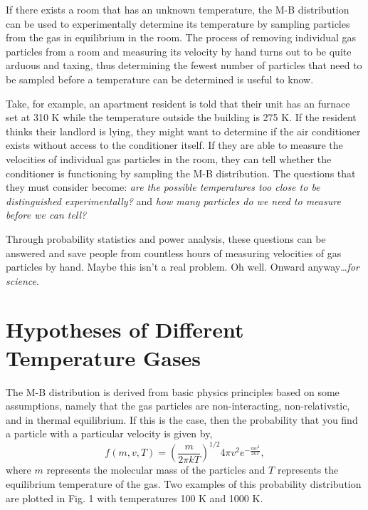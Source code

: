 \documentclass[%
 reprint,
 amsmath,amssymb,
 aps,
]{revtex4-2}
\begin{document}
If there exists a room that has an unknown temperature, the M-B distribution can be used to experimentally determine its temperature by sampling particles from the gas in equilibrium in the room. The process of removing individual gas particles from a room and measuring its velocity by hand turns out to be quite arduous and taxing, thus determining the fewest number of particles that need to be sampled before a temperature can be determined is useful to know.

Take, for example, an apartment resident is told that their unit has an furnace set at 310 K while the temperature outside the building is 275 K. If the resident thinks their landlord is lying, they might want to determine if the air conditioner exists without access to the conditioner itself. If they are able to measure the velocities of individual gas particles in the room, they can tell whether the conditioner is functioning by sampling the M-B distribution. The questions that they must consider become: \textit{are the possible temperatures too close to be distinguished experimentally?} and \textit{how many particles do we need to measure before we can tell?}

Through probability statistics and power analysis, these questions can be answered and save people from countless hours of measuring velocities of gas particles by hand. Maybe this isn't a real problem. Oh well. Onward anyway\dots \textit{for science}.

\section{Hypotheses of Different Temperature Gases}

The M-B distribution is derived from basic physics principles based on some assumptions, namely that the gas particles are non-interacting, non-relativstic, and in thermal equilibrium. If this is the case, then the probability that you find a particle with a particular velocity is given by,
\[
	f(m, v, T) = \left( \frac{m}{2\pi k T} \right)^{1/2}4\pi v^2 e^{-\frac{mv^2}{2kT}},
\]
where $m$ represents the molecular mass of the particles and $T$ represents the equilibrium temperature of the gas. Two examples of this probability distribution are plotted in Fig. 1 with temperatures 100 K and 1000 K. 
\end{document}
